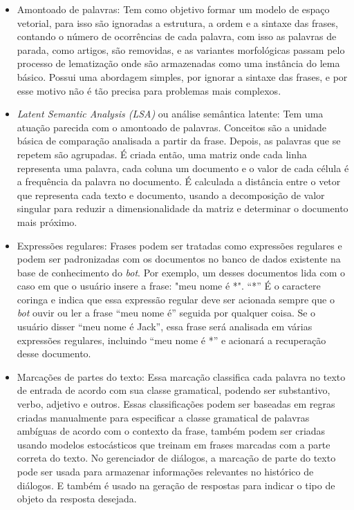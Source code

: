 \documentclass[
	12pt,				%
	oneside,
	a4paper,			%
	english,			%
	french,				%
	spanish,			%
	brazil				%
	]{abntex2}
\begin{document}
\begin{itemize}
	\item Amontoado de palavras: Tem como objetivo formar um modelo de espaço vetorial, para isso são ignoradas a estrutura, a ordem e a sintaxe das frases, contando o número de ocorrências de cada palavra, com isso as palavras de parada, como artigos, são removidas, e as variantes morfológicas passam pelo processo de lematização onde são armazenadas como uma instância do lema básico. Possui uma abordagem simples, por ignorar a sintaxe das frases, e por esse motivo não é tão precisa para problemas mais complexos.
	\item \emph{Latent Semantic Analysis (LSA)} ou análise semântica latente: Tem uma atuação parecida com o amontoado de palavras. Conceitos são a unidade básica de comparação analisada a partir da frase. Depois, as palavras que se repetem são agrupadas. É criada então, uma matriz onde cada linha representa uma palavra, cada coluna um documento e o valor de cada célula é a frequência da palavra no documento. É calculada a distância entre o vetor que representa cada texto e documento, usando a decomposição de valor singular para reduzir a dimensionalidade da matriz e determinar o documento mais próximo.
	\item Expressões regulares: Frases podem ser tratadas como expressões regulares e podem ser padronizadas com os documentos no banco de dados existente na base de conhecimento do \emph{bot}. Por exemplo, um desses documentos lida com o caso em que o usuário insere a frase: "meu nome é *". “*” É o caractere coringa e indica que essa expressão regular deve ser acionada sempre que o \emph{bot} ouvir ou ler a frase “meu nome é” seguida por qualquer coisa. Se o usuário disser “meu nome é Jack”, essa frase será analisada em várias expressões regulares, incluindo “meu nome é *” e acionará a recuperação desse documento. 
	\item Marcações de partes do texto: Essa marcação classifica cada palavra no texto de entrada de acordo com sua classe gramatical, podendo ser substantivo, verbo, adjetivo e outros. Essas classificações podem ser baseadas em regras criadas manualmente para especificar a classe gramatical de palavras ambíguas de acordo com o contexto da frase, também podem ser criadas usando modelos estocásticos que treinam em frases marcadas com a parte correta do texto. No gerenciador de diálogos, a marcação de parte do texto pode ser usada para armazenar informações relevantes no histórico de diálogos. E também é usado na geração de respostas para indicar o tipo de objeto da resposta desejada. 

\end{itemize}
\end{document}
